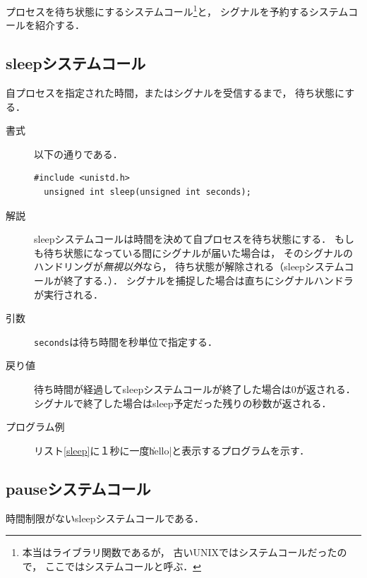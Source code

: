 プロセスを待ち状態にするシステムコール\footnote{
本当はライブラリ関数であるが，
古いUNIXではシステムコールだったので，
ここではシステムコールと呼ぶ．}と，
シグナルを予約するシステムコールを紹介する．

\subsection{sleepシステムコール}
自プロセスを指定された時間，またはシグナルを受信するまで，
待ち状態にする．

\begin{description}
\item[書式] 以下の通りである．

\begin{lstlisting}[numbers=none]
  #include <unistd.h>
  unsigned int sleep(unsigned int seconds);
\end{lstlisting}

\item[解説]
  sleepシステムコールは時間を決めて自プロセスを待ち状態にする．
  もしも待ち状態になっている間にシグナルが届いた場合は，
  そのシグナルのハンドリングが\emph{無視以外}なら，
  待ち状態が解除される（sleepシステムコールが終了する．）．
  シグナルを捕捉した場合は直ちにシグナルハンドラが実行される．

\item[引数]
  \texttt{seconds}は待ち時間を秒単位で指定する．

\item[戻り値]
  待ち時間が経過してsleepシステムコールが終了した場合は0が返される．
  シグナルで終了した場合はsleep予定だった残りの秒数が返される．
  
\item[プログラム例]
  リスト\ref{sleep}に１秒に一度\|hello|と表示するプログラムを示す．

  

\end{description}

\subsection{pauseシステムコール}
時間制限がないsleepシステムコールである．


